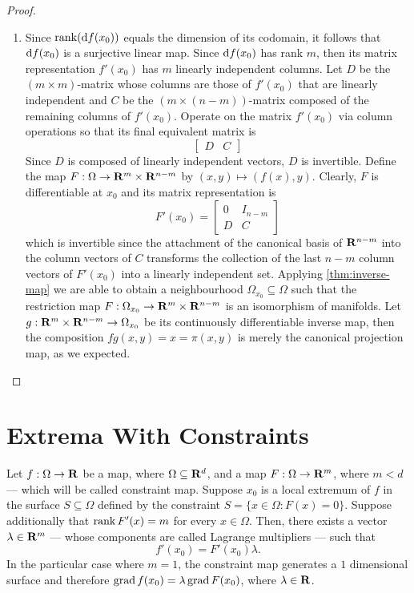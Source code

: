 \begin{proof}
\begin{enumerate}
  \item Since \(\operatorname{rank}(\mathrm{d} f(x_0))\) equals the dimension of its codomain, it
    follows that \(\mathrm{d} f(x_0)\) is a surjective linear map. Since \(\mathrm{d}
    f(x_0)\) has rank \(m\), then its matrix representation \(f'(x_0)\) has
    \(m\) linearly independent columns. Let \(D\) be the \((m \times m)\)-matrix
    whose columns
    are those of \(f'(x_0)\) that are linearly independent and \(C\) be the
    \((m \times (n - m))\)-matrix composed of the remaining columns of
    \(f'(x_0)\). Operate on the matrix \(f'(x_0)\) via column operations so
    that its final equivalent matrix is
    \[
      \begin{bmatrix}
        D & C
      \end{bmatrix}
    \]
    Since \(D\) is composed of linearly independent vectors, \(D\) is
    invertible. Define the map \(F: \Omega \to \mathbf{R}^m \times \mathbf{R}^{n-m}\) by \((x, y) \mapsto (f(x),
    y)\). Clearly, \(F\) is differentiable at \(x_0\) and its matrix
    representation is
    \[
      F'(x_0) =
      \begin{bmatrix}
        0 & I_{n - m}\\
        D & C
      \end{bmatrix}
    \]
    which is invertible since the attachment of the canonical basis of
    \(\mathbf{R}^{n-m}\) into the column vectors of \(C\) transforms the collection of
    the last \(n - m\) column vectors of \(F'(x_{0})\) into a linearly
    independent set. Applying \cref{thm:inverse-map} we are able to obtain a
    neighbourhood \(\Omega_{x_0} \subseteq \Omega\) such that the restriction map \(F: \Omega_{x_0} \to
    \mathbf{R}^m \times\mathbf{R}^{n-m}\) is an isomorphism of manifolds. Let \(g: \mathbf{R}^m \times \mathbf{R}^{n-m} \to
    \Omega_{x_0}\) be its continuously differentiable inverse map, then the
    composition \(f g(x, y) = x = \pi(x, y)\) is merely the canonical projection
    map, as we expected.
\end{enumerate}
\end{proof}

\section{Extrema With Constraints}

\begin{theorem}
\label{thm:existence-lagrange-multipliers}
Let \(f: \Omega \to \mathbf{R}\) be a map, where \(\Omega \subseteq \mathbf{R}^d\), and a map \(F: \Omega \to \mathbf{R}^m\),
where \(m < d\) ---  which will be called constraint map. Suppose \(x_0\) is a
local extremum of \(f\) in the surface \(S \subseteq \Omega\) defined by the constraint \(S
= \{x \in \Omega \colon F(x) = 0\}\). Suppose additionally that \(\operatorname{rank} F'(x) = m\) for
every \(x \in \Omega\). Then, there exists a vector \(\lambda \in \mathbf{R}^m\) --- whose components
are called Lagrange multipliers --- such that
\[
  f'(x_0) = F'(x_0) \lambda.
\]
In the particular case where \(m = 1\), the constraint map generates a \(1\)
dimensional surface and therefore \(\operatorname{grad} f(x_0) = \lambda \operatorname{grad} F(x_0)\), where
\(\lambda \in \mathbf{R}\).
\end{theorem}


